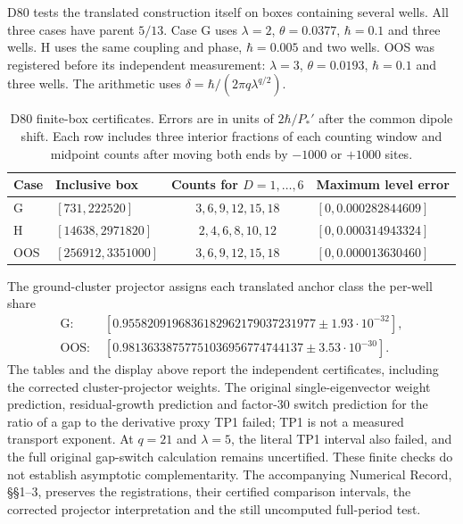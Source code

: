 D80 tests the translated construction itself on boxes containing several wells. All three cases have parent $5/13$. Case G uses $\lambda=2$, $\theta=0.0377$, $\hbar=0.1$ and three wells. H uses the same coupling and phase, $\hbar=0.005$ and two wells. OOS was registered before its independent measurement: $\lambda=3$, $\theta=0.0193$, $\hbar=0.1$ and three wells. The arithmetic uses $\delta=\hbar/(2\pi q\lambda^{q/2})$.

\begin{table}[ht]
\centering\small
\begin{tabular}{@{}llcl@{}}
\toprule
Case & Inclusive box & Counts for $D=1,\ldots,6$ & Maximum level error\\
\midrule
G & $[731,222520]$ & $3,6,9,12,15,18$ & $[0,0.000282844609]$\\
H & $[14638,2971820]$ & $2,4,6,8,10,12$ & $[0,0.000314943324]$\\
OOS & $[256912,3351000]$ & $3,6,9,12,15,18$ & $[0,0.000013630460]$\\
\bottomrule
\end{tabular}
\caption{D80 finite-box certificates. Errors are in units of $2\hbar/P_*'$ after the common dipole shift. Each row includes three interior fractions of each counting window and midpoint counts after moving both ends by $-1000$ or $+1000$ sites.}\label{tab:globalchecks}
\end{table}

The ground-cluster projector assigns each translated anchor class the per-well share
\[
\begin{split}
 \text{G: }&[0.9558209196836182962179037231977
                 \mathbin{\pm}1.93\cdot10^{-32}],\\
 \text{OOS: }&[0.98136338757751036956774744137
                 \mathbin{\pm}3.53\cdot10^{-30}].
\end{split}
\]
The tables and the display above report the independent certificates, including the corrected cluster-projector weights. The original single-eigenvector weight prediction, residual-growth prediction and factor-30 switch prediction for the ratio of a gap to the derivative proxy TP1 failed; TP1 is not a measured transport exponent. At $q=21$ and $\lambda=5$, the literal TP1 interval also failed, and the full original gap-switch calculation remains uncertified. These finite checks do not establish asymptotic complementarity. The accompanying Numerical Record, \S\S1--3, preserves the registrations, their certified comparison intervals, the corrected projector interpretation and the still uncomputed full-period test.


\label{end:diagram}
